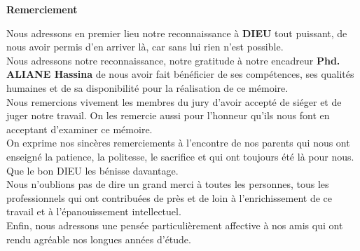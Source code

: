 \documentclass[a4paper,14pt]{report}
\begin{document}
\begin{center}
{\selectfont
\textbf{\Huge Remerciement}\\
\setlength{\parskip}{10ex plus 0.5ex minus 0.2ex}
\Large{

Nous adressons en premier lieu notre reconnaissance à \textbf{DIEU} tout puissant, de nous avoir permis d’en arriver là, car sans lui rien n’est possible.\\

Nous adressons notre reconnaissance, notre gratitude à notre encadreur \textbf{Phd. ALIANE Hassina} de nous avoir fait bénéficier de ses compétences, ses qualités humaines et de sa disponibilité pour la réalisation de ce mémoire.\\

Nous remercions vivement les membres du jury d’avoir accepté de siéger et de juger notre travail. On les remercie aussi pour l’honneur qu’ils nous font en acceptant d’examiner ce mémoire.\\

On exprime nos sincères remerciements à l’encontre de nos parents qui nous ont enseigné la patience, la politesse, le sacrifice et qui ont toujours été là pour nous.\\
Que le bon DIEU les bénisse davantage.\\

Nous n’oublions pas de dire un grand merci à toutes les personnes, tous les professionnels qui ont contribuées de près et de loin à l’enrichissement de ce travail et à l'épanouissement intellectuel.\\

Enfin, nous adressons une pensée particulièrement affective à nos amis qui ont rendu agréable nos longues années d’étude.
}
}
\end{center}
\end{document}
